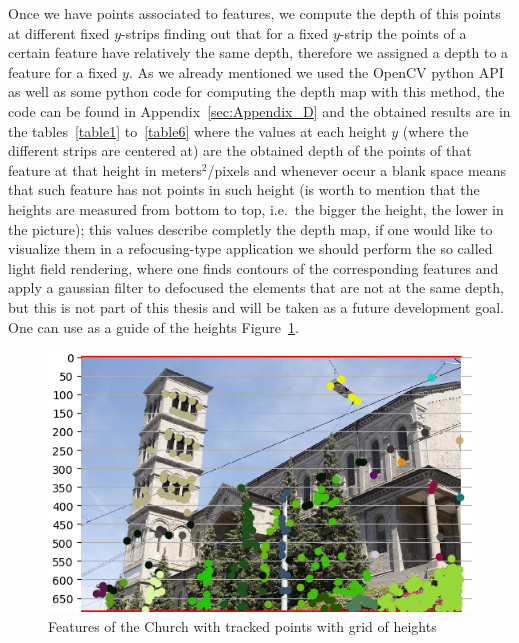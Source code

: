 Once we have points associated to features, we compute the depth of this points at different fixed $y$-strips finding out that for a fixed $y$-strip the points of a certain feature have relatively the same depth, therefore we assigned a depth to a feature for a fixed $y$. As we already mentioned we used the OpenCV python API as well as some python code for computing the depth map with this method, the code can be found in Appendix~\ref{sec:Appendix_D} and the obtained results are in the tables~\ref{table1} to~\ref{table6} where the values at each height $y$ (where the different strips are centered at) are the obtained depth of the points of that feature at that height in meters$^2$/pixels and whenever occur a blank space means that such feature has not points in such height (is worth to mention that the heights are measured from bottom to top, i.e.\ the bigger the height, the lower in the picture); this values describe completly the depth map, if one would like to visualize them in a refocusing-type application we should perform the so called light field rendering, where one finds contours of the corresponding features and apply a gaussian filter to defocused the elements that are not at the same depth, but this is not part of this thesis and will be taken as a future development goal. One can use as a guide of the heights Figure~\ref{fig:feature_points_grid}. 

\begin{figure}[h!]
\centering
\includegraphics[width = 0.9 \textwidth]{./Diagrams/results/data_set/feature_points_grid.png}
\caption{Features of the Church with tracked points with grid of heights}
\label{fig:feature_points_grid}
\end{figure}


